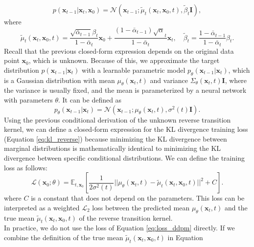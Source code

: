 \begin{equation}
    p(\mathbf{x}_{t-1}|\mathbf{x}_t, \mathbf{x}_0) = \mathcal{N}(\mathbf{x}_{t-1}; \tilde{\mu}_t(\mathbf{x}_t, \mathbf{x}_0, t), \tilde\beta_t\mathbf{I}),
\end{equation}
where 
\begin{equation}\label{eq:tilde_mean}
    \tilde{\mu}_t(\mathbf{x}_t, \mathbf{x}_0, t) = \frac{\sqrt{\bar{\alpha}_{t-1}}\beta_t}{1-\bar{\alpha}_t}\mathbf{x}_0 + \frac{(1-\bar{\alpha}_{t-1})\sqrt{\alpha}_t}{1-\bar{\alpha}_t}\mathbf{x}_t, \quad \tilde\beta_t = \frac{1-\bar{\alpha}_{t-1}}{1-\bar{\alpha}_t}\beta_t.
\end{equation}
Recall that the previous closed-form expression depends on the original data point $\mathbf{x}_0$, which is unknown. Because of this, we approximate the target distribution 
$p(\mathbf{x}_{t-1}|\mathbf{x}_t)$ with a learnable parametric model $p_{\theta}(\mathbf{x}_{t-1}|\mathbf{x}_t)$, which is a Gaussian distribution with mean $\mu_{\theta}(\mathbf{x}_t, t)$ 
and variance $\Sigma_{\theta}(\mathbf{x}_t, t)\mathbf{I}$, where the variance is usually fixed, and the mean is parameterized by a neural network with parameters $\theta$. It can be defined as 
\begin{equation}
    p_{\theta}(\mathbf{x}_{t-1}|\mathbf{x}_t) = \mathcal{N}(\mathbf{x}_{t-1}; \mu_{\theta}(\mathbf{x}_t, t), \sigma^2(t)\mathbf{I}).
\end{equation}
Using the previous conditional derivation of the unknown reverse transition kernel, we can define a closed-form expression for the KL divergence training loss (Equation \ref{eq:kl_reverse}) because 
minimizing the KL divergence between marginal distributions is mathematically identical to minimizing the KL divergence between specific conditional distributions. We can define the training loss as follows:
\begin{equation}\label{eq:loss_ddpm}
    \mathcal{L}(\mathbf{x}_0;\theta) = \mathbb{E}_{t, \mathbf{x}_0} \left[\frac{1}{2\sigma^2(t)} ||\mu_{\theta}(\mathbf{x}_t, t) - \tilde{\mu}_t(\mathbf{x}_t, \mathbf{x}_0, t)||^2 + C \right].
\end{equation}
where $C$ is a constant that does not depend on the parameters. This loss can be interpreted as a weighted $\mathcal{L}_2$ loss between the predicted mean 
$\mu_{\theta}(\mathbf{x}_t, t)$ and the true mean $\tilde{\mu}_t(\mathbf{x}_t, \mathbf{x}_0, t)$ of the reverse transition kernel. \\
In practice, we do not use the loss of Equation \ref{eq:loss_ddpm} directly. If we combine the definition of the true mean $\tilde{\mu}_t(\mathbf{x}_t, \mathbf{x}_0, t)$ in Equation 
